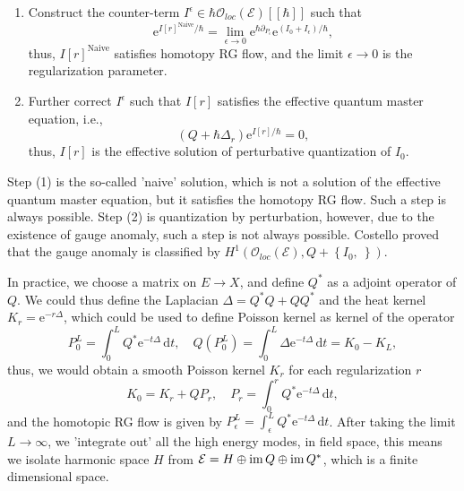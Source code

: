\documentclass[10pt]{article}
\begin{document}
\begin{proposition}
  \begin{enumerate}[(1)]
    \item Construct the counter-term $ I^{\epsilon} \in \hbar \mathcal{O}_{loc}(\mathcal{E})[[\hbar]]$ such that
      \begin{equation*}
        \mathrm{e}^{I[r]^{\text{Naive}} / \hbar} = \lim_{\epsilon \to 0} \mathrm{e}^{\hbar \partial_{P_{\epsilon}}} \mathrm{e}^{(I_0 + I_{\epsilon})/ \hbar},
      \end{equation*}
      thus, $ I[r]^{\text{Naive}}$ satisfies homotopy RG flow, and the limit $ \epsilon \to 0$ is the regularization parameter.
    \item Further correct $ I^{\epsilon}$  such that $ I[r]$ satisfies the effective quantum master equation, i.e.,
      \begin{equation*}
        (Q + \hbar \Delta_r) \mathrm{e}^{I[r] / \hbar} = 0,
      \end{equation*}
      thus, $ I[r]$ is the effective solution of perturbative quantization of $ I_0$.
  \end{enumerate}
  Step (1) is the so-called 'naive' solution, which is not a solution of the effective quantum master equation, but it satisfies the homotopy RG flow. Such a step is always possible.
  Step (2) is quantization by perturbation, however, due to the existence of gauge anomaly, such a step is not always possible. Costello proved that the gauge anomaly is classified by $ H^{1}(\mathcal{O}_{loc}(\mathcal{E}), Q + \left\{ I_0, ~ \right\})$.
\end{proposition}

In practice, we choose a matrix on $ E \rightarrow X$, and define $ Q^{*}$ as a adjoint operator of $ Q$. We could thus define the Laplacian $ \Delta = Q^{*}Q + Q Q^{*}$ and the heat kernel $ K_r = \mathrm{e}^{-r \Delta}$, which could be used to define Poisson kernel as kernel of the operator
\begin{equation*}
  P^{L}_{0} = \int _{0}^{L} Q^{*} \mathrm{e}^{- t \Delta} \, \mathrm{d} t, \quad Q \left( P^{L}_{0} \right) = \int _{0}^{L} \Delta \mathrm{e}^{- t \Delta} \, \mathrm{d} t = K_0 - K_L,
\end{equation*}
thus, we would obtain a smooth Poisson kernel $ K_r$ for each regularization $ r$
\begin{equation*}
  K_0 = K_r + Q P_r, \quad P_r = \int _{0}^{r} Q^{*} \mathrm{e}^{- t \Delta} \, \mathrm{d} t,
\end{equation*}
and the homotopic RG flow is given by $ P_{\epsilon}^{L} = \int _{\epsilon}^{L} Q^{*} \mathrm{e}^{- t \Delta} \, \mathrm{d} t$.
After taking the limit $ L \to \infty$, we 'integrate out' all the high energy modes, in field space, this means we isolate harmonic space $ H$ from $ \mathcal{E} = H \oplus \operatorname{im} Q \oplus \operatorname{im} Q^{*}$, which is a finite dimensional space.

\label{LastPage}
\end{document}
